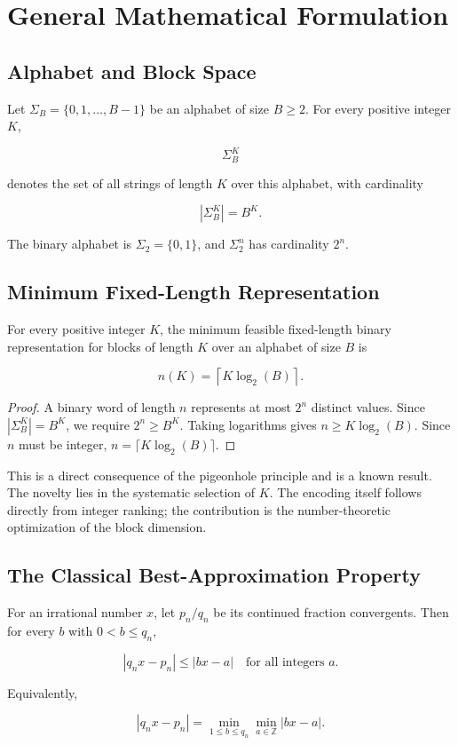\documentclass[10pt, onecolumn]{IEEEtran}
\begin{document}
\section{General Mathematical Formulation}

\subsection{Alphabet and Block Space}

Let $\Sigma_B = \{0,1,\ldots,B-1\}$ be an alphabet of size $B \ge 2$. For every positive integer $K$,

\[
\Sigma_B^{K}
\]

denotes the set of all strings of length $K$ over this alphabet, with cardinality

\[
|\Sigma_B^{K}|=B^K.
\]

The binary alphabet is $\Sigma_2=\{0,1\}$, and $\Sigma_2^n$ has cardinality $2^n$.

\subsection{Minimum Fixed-Length Representation}

\begin{proposition}
For every positive integer $K$, the minimum feasible fixed-length binary representation for blocks of length $K$ over an alphabet of size $B$ is

\[
n(K) = \left\lceil K\log_2(B)\right\rceil.
\]
\end{proposition}

\begin{proof}
A binary word of length $n$ represents at most $2^n$ distinct values. Since $|\Sigma_B^K|=B^K$, we require $2^n \ge B^K$. Taking logarithms gives $n \ge K\log_2(B)$. Since $n$ must be integer, $n=\lceil K\log_2(B)\rceil$.
\end{proof}

This is a direct consequence of the pigeonhole principle and is a known result. The novelty lies in the systematic selection of $K$. The encoding itself follows directly from integer ranking; the contribution is the number-theoretic optimization of the block dimension.

\subsection{The Classical Best-Approximation Property}

\begin{theorem}
For an irrational number $x$, let $p_n/q_n$ be its continued fraction convergents. Then for every $b$ with $0 < b \le q_n$,

\[
|q_n x - p_n| \le |b x - a| \quad \text{for all integers } a.
\]

Equivalently,

\[
|q_n x - p_n| = \min_{1 \le b \le q_n} \min_{a \in \mathbb{Z}} |b x - a|.
\]
\end{theorem}
\end{document}
